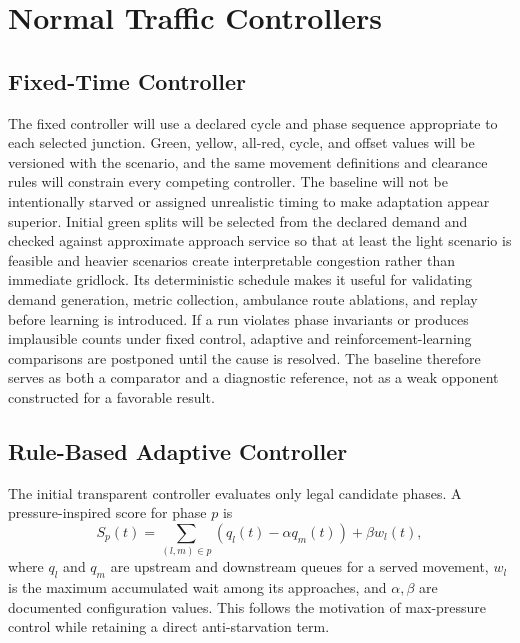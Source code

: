 \section{Normal Traffic Controllers}

\subsection{Fixed-Time Controller}

The fixed controller will use a declared cycle and phase sequence appropriate to each selected junction. Green, yellow, all-red, cycle, and offset values will be versioned with the scenario, and the same movement definitions and clearance rules will constrain every competing controller. The baseline will not be intentionally starved or assigned unrealistic timing to make adaptation appear superior. Initial green splits will be selected from the declared demand and checked against approximate approach service so that at least the light scenario is feasible and heavier scenarios create interpretable congestion rather than immediate gridlock. Its deterministic schedule makes it useful for validating demand generation, metric collection, ambulance route ablations, and replay before learning is introduced. If a run violates phase invariants or produces implausible counts under fixed control, adaptive and reinforcement-learning comparisons are postponed until the cause is resolved. The baseline therefore serves as both a comparator and a diagnostic reference, not as a weak opponent constructed for a favorable result.

\subsection{Rule-Based Adaptive Controller}

The initial transparent controller evaluates only legal candidate phases. A pressure-inspired score for phase $p$ is
\begin{equation}
S_p(t)=\sum_{(l,m)\in p}\left(q_l(t)-\alpha q_m(t)\right)+\beta w_l(t),
\label{eq:rule-score}
\end{equation}
where $q_l$ and $q_m$ are upstream and downstream queues for a served movement, $w_l$ is the maximum accumulated wait among its approaches, and $\alpha,\beta$ are documented configuration values. This follows the motivation of max-pressure control \cite{varaiya2013maxpressure} while retaining a direct anti-starvation term.

